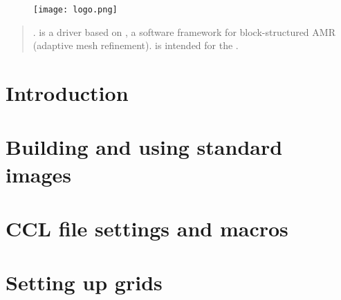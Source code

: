 \begin{figure*}[ht]
    \begin{center}
        \texttt{[image: logo.png]}
    \end{center}
    \label{fig:logo}
\end{figure*}

\newpage

\begin{abstract}

. \CarpetX\space is a \href{https://www.cactuscode.org/index.html}{\Cactus} driver based on \href{https://amrex-codes.github.io/}{\AMReX}, a software framework for block-structured AMR (adaptive mesh refinement). \CarpetX\space is intended for the \href{https://einsteintoolkit.org/}{\ETK}.

\end{abstract}

\newpage

\tableofcontents

\newpage


\section{Introduction}
\label{sec:intro}


\section{Building and using standard images}
\label{sec:std_imgs}

\section{CCL file settings and macros}
\label{sec:ccl_files}


\section{Setting up grids}
\label{sec:grids}


